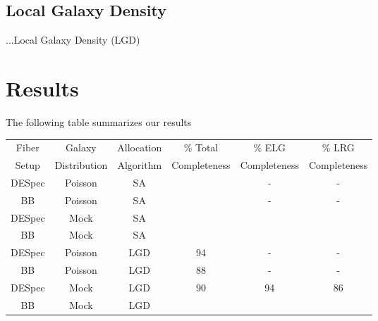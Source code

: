 \documentclass{article}
\begin{document}
\subsection{Local Galaxy Density}
...Local Galaxy Density (LGD)

\section{Results}

The following table summarizes our results

\begin{table}
\begin{tabular}{cccccc}\hline
Fiber & Galaxy & Allocation & \% Total & \% ELG & \% LRG\\
Setup & Distribution & Algorithm & Completeness & Completeness& Completeness\\\hline
DESpec & Poisson & SA & & -& -\\
BB & Poisson & SA & & -& -\\
DESpec & Mock & SA & & &\\
BB & Mock & SA & & &\\
DESpec & Poisson & LGD & 94 & -& -\\
BB & Poisson & LGD & 88& -&-\\
DESpec & Mock & LGD & 90 & 94 & 86\\
BB & Mock & LGD & & &\\\hline
\end{tabular}
\label{Summary of the results.}
\end{table}
\end{document}
